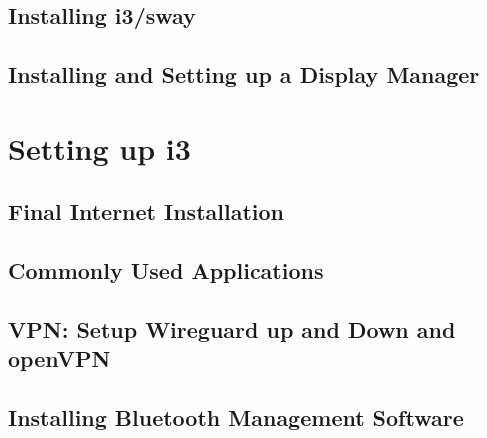 \subsection{Installing i3/sway}






\subsection{Installing and Setting up a Display Manager}

\section{Setting up i3}
\subsection{Final Internet Installation}
\subsection{Commonly Used Applications}
\subsection{VPN: Setup Wireguard up and Down and openVPN}
\subsection{Installing Bluetooth Management Software}
